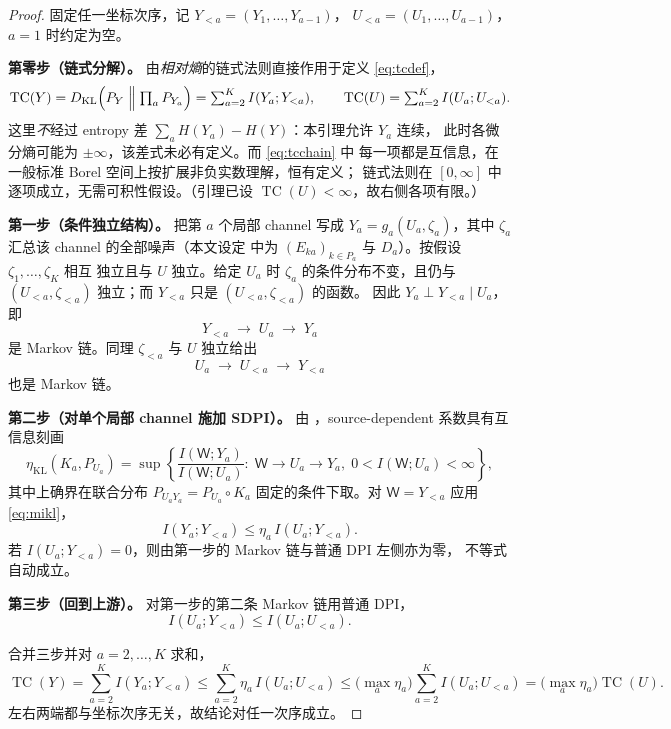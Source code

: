 \documentclass[a4paper,11pt]{article}
\theoremstyle{definition}
\newcommand{\1}{\mathbf 1}
\newcommand{\KL}{\mathrm{KL}}
\newcommand{\TC}{\operatorname{TC}}
\begin{document}
\begin{proof}
固定任一坐标次序，记 $Y_{<a}=(Y_1,\ldots,Y_{a-1})$，
$U_{<a}=(U_1,\ldots,U_{a-1})$，$a=1$ 时约定为空。

\textbf{第零步（链式分解）。} 由\emph{相对熵}的链式法则直接作用于定义
\eqref{eq:tcdef}，
\begin{equation}
\label{eq:tcchain}
\TC(Y)
=
D_{\KL}\Bigl(P_Y\Bigm\|\textstyle\prod_{a}P_{Y_a}\Bigr)
=
\sum_{a=2}^{K}I(Y_a;Y_{<a}),
\qquad
\TC(U)=\sum_{a=2}^{K}I(U_a;U_{<a}).
\end{equation}
这里\emph{不}经过 entropy 差 $\sum_aH(Y_a)-H(Y)$：本引理允许 $Y_a$ 连续，
此时各微分熵可能为 $\pm\infty$，该差式未必有定义。而 \eqref{eq:tcchain} 中
每一项都是互信息，在一般标准 Borel 空间上按扩展非负实数理解，恒有定义；
链式法则在 $[0,\infty]$ 中逐项成立，无需可积性假设。（引理已设
$\TC(U)<\infty$，故右侧各项有限。）

\textbf{第一步（条件独立结构）。} 把第 $a$ 个局部 channel 写成
$Y_a=g_a(U_a,\zeta_a)$，其中 $\zeta_a$ 汇总该 channel 的全部噪声（本文设定
中为 $(E_{ka})_{k\in P_a}$ 与 $D_a$）。按假设 $\zeta_1,\ldots,\zeta_K$ 相互
独立且与 $U$ 独立。给定 $U_a$ 时 $\zeta_a$ 的条件分布不变，且仍与
$(U_{<a},\zeta_{<a})$ 独立；而 $Y_{<a}$ 只是 $(U_{<a},\zeta_{<a})$ 的函数。
因此 $Y_a\perp Y_{<a}\mid U_a$，即
\[
Y_{<a}\;\to\;U_a\;\to\;Y_a
\]
是 Markov 链。同理 $\zeta_{<a}$ 与 $U$ 独立给出
\[
U_a\;\to\;U_{<a}\;\to\;Y_{<a}
\]
也是 Markov 链。

\textbf{第二步（对单个局部 channel 施加 SDPI）。} 由
\cite[Theorem 4]{PolyanskiyWu2017}，source-dependent 系数具有互信息刻画
\begin{equation}
\label{eq:mikl}
\eta_{\KL}(K_a,P_{U_a})
=
\sup\left\{
\frac{I(\mathsf W;Y_a)}{I(\mathsf W;U_a)}
:\;
\mathsf W\to U_a\to Y_a,\;
0<I(\mathsf W;U_a)<\infty
\right\},
\end{equation}
其中上确界在联合分布 $P_{U_aY_a}=P_{U_a}\circ K_a$ 固定的条件下取。对
$\mathsf W=Y_{<a}$ 应用 \eqref{eq:mikl}，
\[
I(Y_a;Y_{<a})\le\eta_a\,I(U_a;Y_{<a}).
\]
若 $I(U_a;Y_{<a})=0$，则由第一步的 Markov 链与普通 DPI 左侧亦为零，
不等式自动成立。

\textbf{第三步（回到上游）。} 对第一步的第二条 Markov 链用普通 DPI，
\[
I(U_a;Y_{<a})\le I(U_a;U_{<a}).
\]

合并三步并对 $a=2,\ldots,K$ 求和，
\[
\TC(Y)
=\sum_{a=2}^{K}I(Y_a;Y_{<a})
\le\sum_{a=2}^{K}\eta_a\,I(U_a;U_{<a})
\le\Big(\max_a\eta_a\Big)\sum_{a=2}^{K}I(U_a;U_{<a})
=\Big(\max_a\eta_a\Big)\TC(U).
\]
左右两端都与坐标次序无关，故结论对任一次序成立。
\end{proof}
\end{document}
